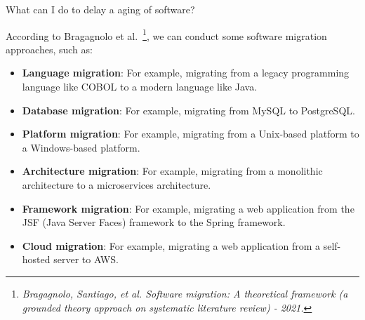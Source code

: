\documentclass[newPxFont,numfooter,sectionpages]{beamer}
\begin{document}
\begin{frame}[c]{What can I do to delay a aging of software?}

    {\footnotesize According to Bragagnolo et al.~\footnote{\emph{\footnotesize Bragagnolo, Santiago, et al. Software migration: A theoretical framework (a grounded theory approach on systematic literature review) - 2021.}}, we can conduct some software migration approaches, such as:}
{\scriptsize
   \begin{itemize}
        \item \textbf{Language migration}: For example, migrating from a legacy programming language like COBOL to a modern language like Java.
        \item \textbf{Database migration}: For example, migrating from MySQL to PostgreSQL.

        \item \textbf{Platform migration}:  For example, migrating from a Unix-based platform to a Windows-based platform.
        \item \textbf{Architecture migration}:  For example, migrating from a monolithic architecture to a microservices architecture.
        \item \textbf{Framework migration}: For example, migrating a web application from the JSF (Java Server Faces) framework to the Spring framework.
        \item \textbf{Cloud migration}: For example, migrating a web application from a self-hosted server to AWS.
   \end{itemize}
}
\end{frame}


\end{document}

